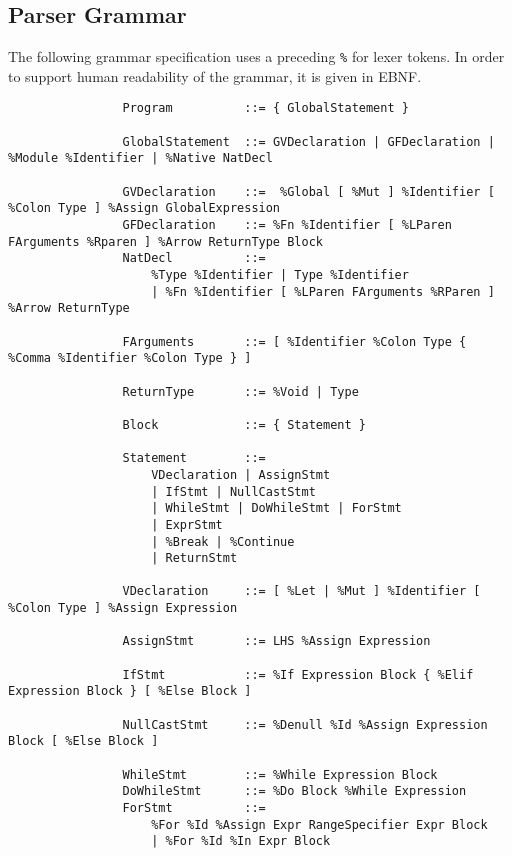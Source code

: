 \documentclass{article}
\begin{document}
		\subsection{Parser Grammar}
		
			The following grammar specification uses a preceding \texttt{\%} for lexer tokens. In order to support human readability of the grammar, it is given in EBNF.
		
			\begin{small}\begin{verbatim}
				Program          ::= { GlobalStatement }
				                 
				GlobalStatement  ::= GVDeclaration | GFDeclaration | %Module %Identifier | %Native NatDecl
				                 
				GVDeclaration    ::=  %Global [ %Mut ] %Identifier [ %Colon Type ] %Assign GlobalExpression
				GFDeclaration    ::= %Fn %Identifier [ %LParen FArguments %Rparen ] %Arrow ReturnType Block
				NatDecl          ::=
				    %Type %Identifier | Type %Identifier
				    | %Fn %Identifier [ %LParen FArguments %RParen ] %Arrow ReturnType
				                 
				FArguments       ::= [ %Identifier %Colon Type { %Comma %Identifier %Colon Type } ]
				
				ReturnType       ::= %Void | Type
				                 
				Block            ::= { Statement }
				
				Statement        ::=
				    VDeclaration | AssignStmt
				    | IfStmt | NullCastStmt
				    | WhileStmt | DoWhileStmt | ForStmt
				    | ExprStmt
				    | %Break | %Continue
				    | ReturnStmt
				                 
				VDeclaration     ::= [ %Let | %Mut ] %Identifier [ %Colon Type ] %Assign Expression
				                 
				AssignStmt       ::= LHS %Assign Expression
				                 
				IfStmt           ::= %If Expression Block { %Elif Expression Block } [ %Else Block ]
				                 
				NullCastStmt     ::= %Denull %Id %Assign Expression Block [ %Else Block ]
				                 
				WhileStmt        ::= %While Expression Block
				DoWhileStmt      ::= %Do Block %While Expression
				ForStmt          ::=
				    %For %Id %Assign Expr RangeSpecifier Expr Block
				    | %For %Id %In Expr Block
				                 

\end{verbatim}
\end{small}
\end{document}
